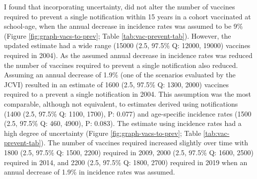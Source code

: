 \documentclass[11pt,twoside]{bristolthesis}
\begin{document}
  I found that incorporating uncertainty, did not alter the number of vaccines required to prevent a single notification within 15 years in a cohort vaccinated at school-age, when the annual decrease in incidence rates was assumed to be 9\% (Figure \ref{fig:graph-vacs-to-prev}; Table \ref{tab:vac-prevent-tab}). However, the updated estimate had a wide range (15000 (2.5, 97.5\% Q: 12000, 19000) vaccines required in 2004). As the assumed annual decrease in incidence rates was reduced the number of vaccines required to prevent a single notification also reduced. Assuming an annual decrease of 1.9\% (one of the scenarios evaluated by the JCVI) resulted in an estimate of 1600 (2.5, 97.5\% Q: 1300, 2000) vaccines required to a prevent a single notification in 2004. This assumption was the most comparable, although not equivalent, to estimates derived using notifications (1400 (2.5, 97.5\% Q: 1100, 1700), P: 0.077) and age-specific incidence rates (1500 (2.5, 97.5\% Q: 460, 4900), P: 0.083). The estimate using incidence rates had a high degree of uncertainty (Figure \ref{fig:graph-vacs-to-prev}; Table \ref{tab:vac-prevent-tab}). The number of vaccines required increased slightly over time with 1800 (2.5, 97.5\% Q: 1500, 2200) required in 2009, 2000 (2.5, 97.5\% Q: 1600, 2500) required in 2014, and 2200 (2.5, 97.5\% Q: 1800, 2700) required in 2019 when an annual decrease of 1.9\% in incidence rates was assumed.
  
\end{document}
